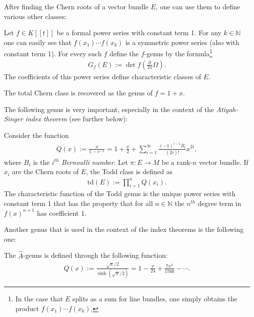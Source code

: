     After finding the Chern roots of a vector bundle $E$, one can use them to define various other classes:
    \begin{construct}[Genus]
        Let $f\in K[[t]]$ be a formal power series with constant term 1. For any $k\in\mathbb{N}$ one can easily see that $f(x_1)\cdots f(x_k)$ is a symmetric power series (also with constant term 1). For every such $f$ define the $f$-genus by the formula\footnote{In the case that $E$ splits as a sum for line bundles, one simply obtains the product $f(x_1)\cdots f(x_k)$.}
        \begin{gather}
            G_f(E) := \det f\left(\frac{it}{2\pi}\Omega\right).
        \end{gather}
        The coefficients of this power series define characteristic classes of $E$.
    \end{construct}

    \begin{example}
        The total Chern class is recovered as the genus of $f=1+x$.
    \end{example}

    The following genus is very important, especially in the context of the \textit{Atiyah-Singer index theorem} (see further below):
    \begin{example}
        Consider the function
        \begin{gather}
            Q(x) := \frac{x}{1-e^{-x}} = 1 + \frac{x}{2} + \sum_{i=1}^\infty\frac{(-1)^{i-1}B_i}{(2i)!}x^{2i},
        \end{gather}
        where $B_i$ is the $i^{th}$ \textit{Bernoulli number}. Let $\pi:E\rightarrow M$ be a rank-$n$ vector bundle. If $x_i$ are the Chern roots of $E$, the Todd class is defined as
        \begin{gather}
            \mathrm{td}(E) := \prod_{i=1}^nQ(x_i).
        \end{gather}
        The characteristic function of the Todd genus is the unique power series with constant term 1 that has the property that for all $n\in\mathbb{N}$ the $n^{th}$ degree term in $f(x)^{n+1}$ has coefficient 1.
    \end{example}
    Another genus that is used in the context of the index theorems is the following one:
    \begin{example}\label{bundle:a_roof_genus}
        The $\hat{A}$-genus is defined through the following function:
        \begin{gather}
            Q(x) := \frac{\sqrt{x}/2}{\sinh(\sqrt{x}/2)} = 1 - \frac{x}{24} + \frac{7x^2}{5760} - \cdots.
        \end{gather}
    \end{example}

